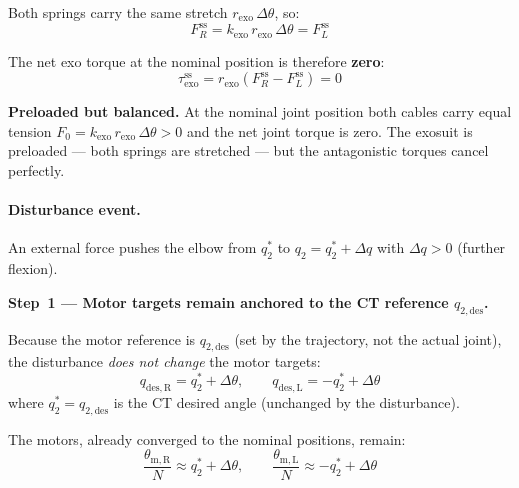 \documentclass[11pt,a4paper]{article}
\begin{document}
Both springs carry the same stretch $r_{\mathrm{exo}}\,\Delta\theta$, so:
\begin{equation}
    F_R^{\mathrm{ss}} = k_{\mathrm{exo}}\,r_{\mathrm{exo}}\,\Delta\theta
    = F_L^{\mathrm{ss}}
\end{equation}

The net exo torque at the nominal position is therefore \textbf{zero}:
\begin{equation}
    \tau_{\mathrm{exo}}^{\mathrm{ss}}
      = r_{\mathrm{exo}}\!\left(F_R^{\mathrm{ss}} - F_L^{\mathrm{ss}}\right) = 0
\label{eq:tau_nom_zero}
\end{equation}

\begin{resultbox}
\textbf{Preloaded but balanced.}
At the nominal joint position both cables carry equal tension
$F_0 = k_{\mathrm{exo}}\,r_{\mathrm{exo}}\,\Delta\theta > 0$ and the net
joint torque is zero.  The exosuit is preloaded --- both springs are stretched
--- but the antagonistic torques cancel perfectly.
\end{resultbox}

\bigskip
\paragraph{Disturbance event.}

An external force pushes the elbow from $q_2^{*}$ to
$q_2 = q_2^{*} + \Delta q$ with $\Delta q > 0$ (further flexion).

\bigskip
\textbf{Step~1 --- Motor targets remain anchored to the CT reference $q_{2,\mathrm{des}}$.}

Because the motor reference is $q_{2,\mathrm{des}}$ (set by the trajectory, not
the actual joint), the disturbance \emph{does not change} the motor targets:
\begin{equation}
    q_{\mathrm{des,R}} = q_2^{*} + \Delta\theta, \qquad
    q_{\mathrm{des,L}} = -q_2^{*} + \Delta\theta
\label{eq:new_targets}
\end{equation}
where $q_2^* = q_{2,\mathrm{des}}$ is the CT desired angle (unchanged by the
disturbance).

The motors, already converged to the nominal positions, remain:
\begin{equation}
    \frac{\theta_{\mathrm{m,R}}}{N} \approx q_2^{*}+\Delta\theta, \qquad
    \frac{\theta_{\mathrm{m,L}}}{N} \approx -q_2^{*}+\Delta\theta
\label{eq:motors_still_nominal}
\end{equation}
\end{document}
